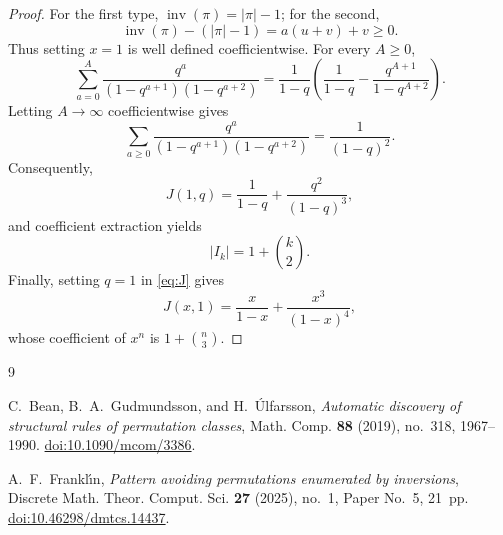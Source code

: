 \documentclass[11pt]{amsart}
\newcommand{\inv}{\operatorname{inv}}
\begin{document}
\begin{proof}
For the first type, $\inv(\pi)=|\pi|-1$; for the second,
\[
\inv(\pi)-(|\pi|-1)
=
a(u+v)+v
\ge0.
\]
Thus setting $x=1$ is well defined coefficientwise. For every $A\ge0$,
\[
\sum_{a=0}^{A}
\frac{q^a}{(1-q^{a+1})(1-q^{a+2})}
=
\frac{1}{1-q}
\left(
\frac{1}{1-q}
-
\frac{q^{A+1}}{1-q^{A+2}}
\right).
\]
Letting $A\to\infty$ coefficientwise gives
\[
\sum_{a\ge0}
\frac{q^a}{(1-q^{a+1})(1-q^{a+2})}
=
\frac{1}{(1-q)^2}.
\]
Consequently,
\[
J(1,q)
=
\frac{1}{1-q}
+
\frac{q^2}{(1-q)^3},
\]
and coefficient extraction yields
\[
|I_k|
=
1+\binom{k}{2}.
\]
Finally, setting $q=1$ in \eqref{eq:J} gives
\[
J(x,1)
=
\frac{x}{1-x}
+
\frac{x^3}{(1-x)^4},
\]
whose coefficient of $x^n$ is $1+\binom{n}{3}$.
\end{proof}

\begin{thebibliography}{9}

C.~Bean, B.~A.~Gudmundsson, and H.~\'{U}lfarsson,
\emph{Automatic discovery of structural rules of permutation classes},
Math. Comp. \textbf{88} (2019), no.~318, 1967--1990.
\href{https://doi.org/10.1090/mcom/3386}
{doi:10.1090/mcom/3386}.

A.~F.~Frankl\'{\i}n,
\emph{Pattern avoiding permutations enumerated by inversions},
Discrete Math. Theor. Comput. Sci. \textbf{27} (2025), no.~1,
Paper No.~5, 21~pp.
\href{https://doi.org/10.46298/dmtcs.14437}
{doi:10.46298/dmtcs.14437}.

\end{thebibliography}
\end{document}
